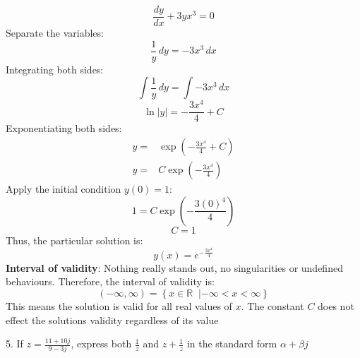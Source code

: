 \documentclass[a4paper, 12pt]{report}
\def\ni{green!60!black!40!white}
\begin{document}
    \[\frac{dy}{dx} + 3y x^3 = 0\]
    Separate the variables:
    \[\frac{1}{y} \, dy = -3x^3 \, dx\]
    Integrating both sides:
    \[\int \frac{1}{y} \, dy = \int -3x^3 \, dx\]
    \[\ln|y| = -\frac{3x^4}{4} + C\]
    Exponentiating both sides:
    \begin{align*}
        y=& \exp\left(-\frac{3x^4}{4} + C\right)\\
        y=& C \exp\left(-\frac{3x^4}{4}\right)
    \end{align*}
    Apply the initial condition \( y(0) = 1 \):
    \[1 = C \exp\left(-\frac{3(0)^4}{4}\right)\]
    \[C = 1\]
    Thus, the particular solution is:
    \[\boxed{y(x) = e^{-\frac{3x^4}{4}}}\]
    \textbf{Interval of validity}: Nothing really stands out, no singularities or undefined behaviours. Therefore, the interval of validity is:
    \[(-\infty, \infty) = \left\{x \in \mathbb{R} \;\; | -\infty < x < \infty\right\}\]
    This means the solution is valid for all real values of \(x\). The constant \(C\) does not effect the solutions validity regardless of its value
    
    \newpage
    
    \begin{tcolorbox}[title={\color{black}\section{Q5}}, colback=white, colframe=\ni, boxrule=1mm, width=1\textwidth]
        5. If \( z = \frac{11 + 10{j}}{9 - 3{j}} \), express both \( \frac{1}{z} \) and \( z + \frac{1}{z} \) in the standard form \( \alpha + \beta {j} \)
    \end{tcolorbox}
    
\end{document}
